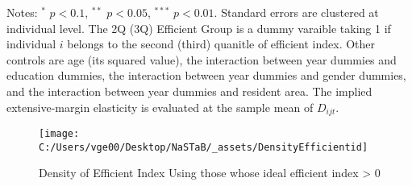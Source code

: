 \documentclass[ review  , 3p ]{elsarticle}
\begin{document}
\begin{table}
\begin{threeparttable}
  \begin{tablenotes}
  \item Notes: $^{*}$ $p < 0.1$, $^{**}$ $p < 0.05$, $^{***}$ $p < 0.01$. Standard errors are clustered at individual level. The 2Q (3Q) Efficient Group is a dummy varaible taking 1 if individual $i$ belongs to the second (third) quanitle of efficient index. Other controls are age (its squared value), the interaction between year dummies and education dummies, the interaction between year dummies and gender dummies, and the interaction between year dummies and resident area. The implied extensive-margin elasticity is evaluated at the sample mean of $D_{ijt}$.
  \end{tablenotes}
  \end{threeparttable}
  \end{table}
  
  \begin{figure}
  
  {\centering \texttt{[image: C:/Users/vge00/Desktop/NaSTaB/\_assets/DensityEfficientid]} 
  
  }
  
  \caption{Density of Efficient Index Using those whose ideal efficient index > 0}\label{fig:unnamed-chunk-7}
  \end{figure}
  
\end{document}
